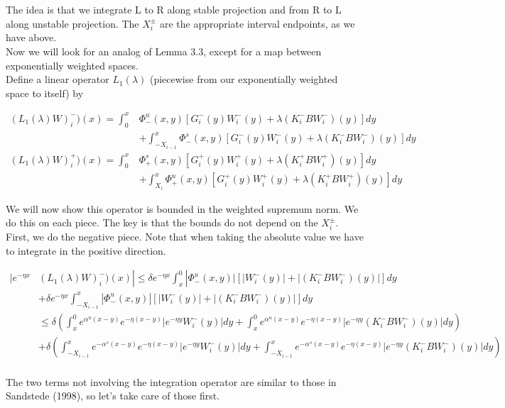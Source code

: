 \documentclass[12pt]{article}
\begin{document}
The idea is that we integrate L to R along stable projection and from R to L along unstable projection. The $X_i^\pm$ are the appropriate interval endpoints, as we have above.\\

Now we will look for an analog of Lemma 3.3, except for a map between exponentially weighted spaces. \\

Define a linear operator $L_1(\lambda)$ (piecewise from our exponentially weighted space to itself) by

\begin{align*}
(L_1(\lambda)W)_i^-)(x) = \int_0^x &\Phi^u_-(x, y)[G_i^-(y) W_i^-(y) + \lambda (K_i^- B W_i^-)(y) ] dy \\
&+ \int_{-X_{i-1}}^x \Phi^s_-(x, y)[G_i^-(y) W_i^-(y) + \lambda (K_i^-B W_i^-)(y) ] dy \\
(L_1(\lambda)W)_i^+)(x) = \int_0^x &\Phi^s_+(x, y)[G_i^+(y) W_i^+(y) + \lambda (K_i^+ B W_i^+)(y)] dy \\
&+ \int_{X_{i}}^x \Phi^u_+(x, y)[G_i^+(y) W_i^+(y) + \lambda (K_i^+ B W_i^+)(y) ] dy
\end{align*}

We will now show this operator is bounded in the weighted supremum norm. We do this on each piece. The key is that the bounds do not depend on the $X_i^\pm$. First, we do the negative piece. Note that when taking the absolute value we have to integrate in the positive direction.

\begin{align*}
|e^{-\eta x} & (L_1(\lambda)W)_i^-)(x) | \leq \delta e^{-\eta x} \int_x^0 |\Phi^u_-(x, y)|[|W_i^-(y)| + |(K_i^- B W_i^-)(y)| ] dy \\
&+ \delta e^{-\eta x} \int_{-X_{i-1}}^x |\Phi^u_-(x, y)|[|W_i^-(y)| + |(K_i^- B W_i^-)(y)| ] dy \\
&\leq \delta \left( \int_x^0 e^{\alpha^u (x-y)}e^{-\eta(x-y)}|e^{-\eta y} W_i^-(y)| dy 
+ \int_x^0 e^{\alpha^u (x-y)}e^{-\eta(x-y)}|e^{-\eta y} (K_i^- B W_i^-)(y)| dy  \right) \\
&+ \delta \left( \int_{-X_{i-1}}^x e^{-\alpha^s (x-y)}e^{-\eta(x-y)}|e^{-\eta y} W_i^-(y)| dy 
+ \int_{-X_{i-1}}^x e^{-\alpha^s (x-y)}e^{-\eta(x-y)}|e^{-\eta y} (K_i^- B W_i^-)(y)| dy  \right) \\ 
\end{align*}

The two terms not involving the integration operator are similar to those in Sandstede (1998), so let's take care of those first.
\end{document}
